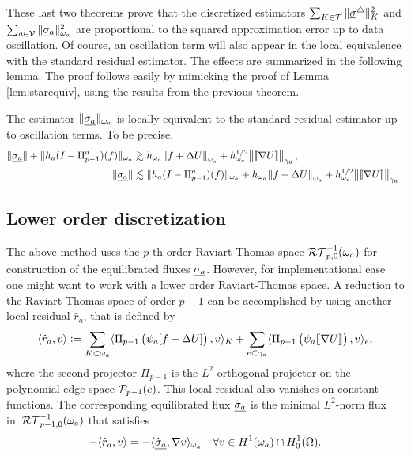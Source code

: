 \documentclass[thesis.tex]{subfiles}
\begin{document}
These last two theorems prove that the discretized estimators $\sum_{K \in \T} \uanorm{\vsig^\triangle}_K^2$ and $\sum_{a\in \V} \uanorm{\vsiga}^2_{\w_a}$ are
proportional to the squared approximation error  up to data oscillation.
Of course, an oscillation term will also appear in the local equivalence with the standard residual estimator. 
The effects are summarized in the following lemma. The proof follows easily by mimicking the proof of Lemma \ref{lem:starequiv},
using the results from the previous theorem.
\begin{lem}
  \label{lem:locequivosc}
  The estimator $\uanorm{\v{\sigma_a}}_{\w_a}$ is locally equivalent to the standard residual estimator up to oscillation terms.
  To be precise, 
  \begin{align*}
    \uanorm{\v{\sigma_a}} + \uanorm{h_a(I - \Pi_{p-1}^a)(f)}_{\w_a} &\gtrsim h_{\w_a} \norm{f + \Delta U}_{\w_a} + h^{1/2}_{\w_a} \norm{\llbracket \nabla U \rrbracket}_{\gamma_a},\\
    \uanorm{\v{\sigma_a}} &\lesssim \uanorm{h_a(I - \Pi_{p-1}^a)(f)}_{\w_a} + h_{\w_a} \norm{f + \Delta U}_{\w_a} + h^{1/2}_{\w_a} \norm{\llbracket \nabla U \rrbracket}_{\gamma_a}.
  \end{align*}
\end{lem}
\subsection{Lower order discretization}
\label{sec:lowerorder}
  The above method uses the $p$-th order Raviart-Thomas space $\RT^{-1}_{p,0}(\w_a)$ for construction of the equilibrated fluxes  $\vsiga$.
  However, for implementational ease one might want to work with a lower order Raviart-Thomas space.
  A reduction to the  Raviart-Thomas space of order $p-1$  can be accomplished by
  using another local residual $\hat r_a$, that is defined by
  \[
    \ip{\hat r_a,v} := \sum_{K \subset \w_a} \ip{\Pi_{p-1} \left(\psi_a[f + \Delta U]\right), v}_K +
    \sum_{e \subset \gamma_a} \ip{\Pi_{p-1} \left(\psi_a \llbracket \nabla U \rrbracket \right),v}_e,
  \]
  where the second projector $\Pi_{p-1}$ is the $L^2$-orthogonal projector on the polynomial edge space $\P_{p-1}(e)$.
  This local residual also vanishes on constant functions.
  The corresponding equilibrated flux $\vhsiga$  is the minimal $L^2$-norm flux in~$\RT_{p-1,0}^{-1}(\w_a)$ that satisfies
  \[
    -\ip{\hat r_a, v} = -\ip{\vhsiga, \nabla v}_{\w_a} \quad \forall v \in H^1(\w_a) \cap H_0^1(\O).
  \]
\end{document}
